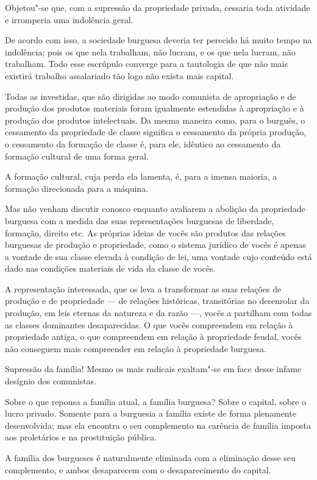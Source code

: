 Objetou"-se que, com a supressão da propriedade privada, cessaria toda
atividade e irromperia uma indolência geral.

De acordo com isso, a sociedade burguesa deveria ter perecido há muito
tempo na indolência; pois os que nela trabalham, não lucram, e os que
nela lucram, não trabalham. Todo esse escrúpulo converge para a
tautologia de que não mais existirá trabalho assalariado tão logo não
exista mais capital.

Todas as investidas, que são dirigidas ao modo comunista de apropriação
e de produção dos produtos materiais foram igualmente estendidas à
apropriação e à produção dos produtos intelectuais. Da mesma maneira
como, para o burguês, o cessamento da propriedade de classe significa o
cessamento da própria produção, o cessamento da formação de
classe é, para ele, idêntico ao cessamento da formação cultural de uma
forma geral.

A formação cultural, cuja perda ela lamenta, é, para a imensa maioria, a
formação direcionada para a máquina.

Mas não venham discutir conosco enquanto avaliarem a abolição da
propriedade burguesa com a medida das suas representações burguesas de
liberdade, formação, direito etc. As próprias ideias de vocês são
produtos das relações burguesas de produção e propriedade, como o
sistema jurídico de vocês é apenas a vontade de sua classe elevada à
condição de lei, uma vontade cujo conteúdo está dado nas condições
materiais de vida da classe de vocês.

A representação interessada, que os leva a transformar as suas relações
de produção e de propriedade  ---  de relações históricas, transitórias no
desenrolar da produção, em leis eternas da natureza e da razão  ---, vocês
a partilham com todas as classes dominantes desaparecidas. O que vocês
compreendem em relação à propriedade antiga, o que compreendem em
relação à propriedade feudal, vocês não conseguem mais compreender em
relação à propriedade burguesa.

Supressão da família! Mesmo os mais radicais exaltam"-se em face desse
infame desígnio dos comunistas.

Sobre o que repousa a família atual, a família burguesa? Sobre o
capital, sobre o lucro privado. Somente para a burguesia a família
existe de forma plenamente desenvolvida; mas ela encontra o seu
complemento na carência de família imposta aos proletários e na
prostituição pública.

A família dos burgueses é naturalmente eliminada com a eliminação desse
seu complemento, e ambos desaparecem com o desaparecimento do capital.

